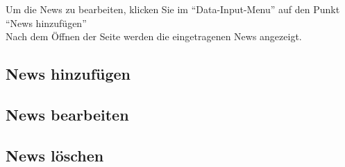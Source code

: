 Um die News zu bearbeiten, klicken Sie im \enquote{Data-Input-Menu} auf den Punkt \enquote{News hinzufügen}
\\
Nach dem Öffnen der Seite werden die eingetragenen News angezeigt.
\\
\subsection{News hinzufügen}
\subsection{News bearbeiten}
\subsection{News löschen}